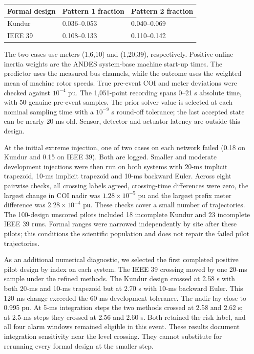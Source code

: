 \documentclass[10pt]{article}
\begin{document}
\begin{center}\begin{tabular}{lll}\toprule Formal design & Pattern 1 fraction & Pattern 2 fraction\\\midrule
Kundur & 0.036--0.053 & 0.040--0.069\\
IEEE 39 & 0.108--0.133 & 0.110--0.142\\\bottomrule\end{tabular}\end{center}
The two cases use meters (1,6,10) and (1,20,39), respectively. Positive online inertia weights are the ANDES system-base machine start-up times. The predictor uses the measured bus channels, while the outcome uses the weighted mean of machine rotor speeds. True pre-event COI and meter deviations were checked against $10^{-4}$ pu. The 1,051-point recording spans 0--21 s absolute time, with 50 genuine pre-event samples. The prior solver value is selected at each nominal sampling time with a $10^{-9}$ s round-off tolerance; the last accepted state can be nearly 20 ms old. Sensor, detector and actuator latency are outside this design.

At the initial extreme injection, one of two cases on each network failed (0.18 on Kundur and 0.15 on IEEE 39). Both are logged. Smaller and moderate development injections were then run on both systems with 20-ms implicit trapezoid, 10-ms implicit trapezoid and 10-ms backward Euler. Across eight pairwise checks, all crossing labels agreed, crossing-time differences were zero, the largest change in COI nadir was $1.28\times10^{-5}$ pu and the largest prefix meter difference was $2.28\times10^{-4}$ pu. These checks cover a small number of trajectories. The 100-design unscored pilots included 18 incomplete Kundur and 23 incomplete IEEE 39 runs. Formal ranges were narrowed independently by site after these pilots; this conditions the scientific population and does not repair the failed pilot trajectories.

As an additional numerical diagnostic, we selected the first completed positive pilot design by index on each system. The IEEE 39 crossing moved by one 20-ms sample under the refined methods. The Kundur design crossed at 2.58 s with both 20-ms and 10-ms trapezoid but at 2.70 s with 10-ms backward Euler. This 120-ms change exceeded the 60-ms development tolerance. The nadir lay close to 0.995 pu. At 5-ms integration steps the two methods crossed at 2.58 and 2.62 s; at 2.5-ms steps they crossed at 2.56 and 2.60 s. Both retained the risk label, and all four alarm windows remained eligible in this event. These results document integration sensitivity near the level crossing. They cannot substitute for rerunning every formal design at the smaller step.
\end{document}
